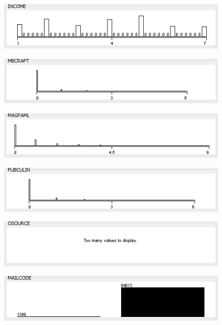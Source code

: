 \begin{figure}
\includegraphics{./images/expl_rep/Cattura-00-06}
\end{figure}
\begin{figure}
\includegraphics{./images/expl_rep/Cattura-00-07}
\end{figure}
\begin{figure}
\includegraphics{./images/expl_rep/Cattura-00-08}
\end{figure}
\begin{figure}
\includegraphics{./images/expl_rep/Cattura-00-09}
\end{figure}
\begin{figure}
\includegraphics{./images/expl_rep/Cattura-01-00}
\end{figure}
\begin{figure}
\includegraphics{./images/expl_rep/Cattura-01-01}
\end{figure}

